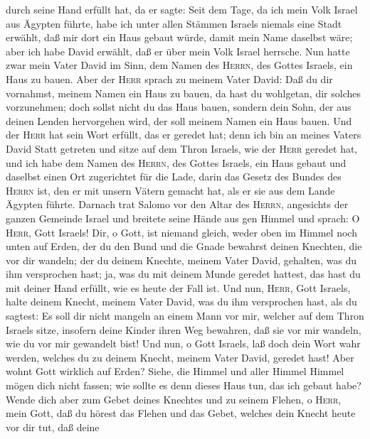 durch seine Hand erfüllt hat, da er sagte:  Seit dem
Tage, da ich mein Volk Israel aus Ägypten führte, habe ich unter allen
Stämmen Israels niemals eine Stadt erwählt, daß mir dort ein Haus gebaut
würde, damit mein Name daselbst wäre; aber ich habe David erwählt, daß
er über mein Volk Israel herrsche.  Nun hatte zwar mein
Vater David im Sinn, dem Namen des \textsc{Herrn}, des Gottes Israels,
ein Haus zu bauen.  Aber der \textsc{Herr} sprach zu
meinem Vater David: Daß du dir vornahmst, meinem Namen ein Haus zu
bauen, da hast du wohlgetan, dir solches vorzunehmen; 
doch sollst nicht du das Haus bauen, sondern dein Sohn, der aus deinen
Lenden hervorgehen wird, der soll meinem Namen ein Haus bauen.
 Und der \textsc{Herr} hat sein Wort erfüllt, das er
geredet hat; denn ich bin an meines Vaters David Statt getreten und
sitze auf dem Thron Israels, wie der \textsc{Herr} geredet hat, und ich
habe dem Namen des \textsc{Herrn}, des Gottes Israels, 
ein Haus gebaut und daselbst einen Ort zugerichtet für die Lade, darin
das Gesetz des Bundes des \textsc{Herrn} ist, den er mit unsern Vätern
gemacht hat, als er sie aus dem Lande Ägypten führte. 
Darnach trat Salomo vor den Altar des \textsc{Herrn}, angesichts der
ganzen Gemeinde Israel und breitete seine Hände aus gen Himmel und
sprach:  O \textsc{Herr}, Gott Israels! Dir, o Gott, ist
niemand gleich, weder oben im Himmel noch unten auf Erden, der du den
Bund und die Gnade bewahrst deinen Knechten, die vor dir wandeln;
 der du deinem Knechte, meinem Vater David, gehalten, was
du ihm versprochen hast; ja, was du mit deinem Munde geredet hattest,
das hast du mit deiner Hand erfüllt, wie es heute der Fall ist.
 Und nun, \textsc{Herr}, Gott Israels, halte deinem
Knecht, meinem Vater David, was du ihm versprochen hast, als du sagtest:
Es soll dir nicht mangeln an einem Mann vor mir, welcher auf dem Thron
Israels sitze, insofern deine Kinder ihren Weg bewahren, daß sie vor mir
wandeln, wie du vor mir gewandelt bist!  Und nun, o Gott
Israels, laß doch dein Wort wahr werden, welches du zu deinem Knecht,
meinem Vater David, geredet hast!  Aber wohnt Gott
wirklich auf Erden? Siehe, die Himmel und aller Himmel Himmel mögen dich
nicht fassen; wie sollte es denn dieses Haus tun, das ich gebaut habe?
 Wende dich aber zum Gebet deines Knechtes und zu seinem
Flehen, o \textsc{Herr}, mein Gott, daß du hörest das Flehen und das
Gebet, welches dein Knecht heute vor dir tut,  daß deine
